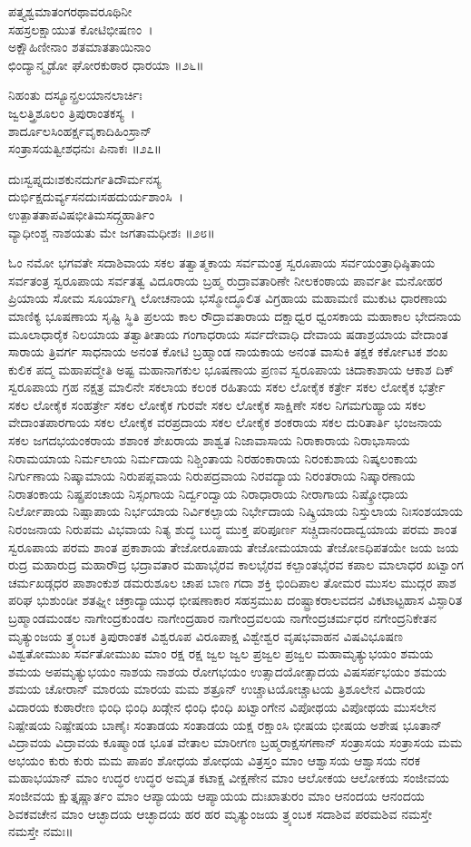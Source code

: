 ಪತ್ತ್ಯಶ್ವಮಾತಂಗರಥಾವರೂಥಿನೀ\\ಸಹಸ್ರಲಕ್ಷಾಯುತ ಕೋಟಿಭೀಷಣಂ~।\\
ಅಕ್ಷೌಹಿಣೀನಾಂ ಶತಮಾತತಾಯಿನಾಂ\\ಛಿಂದ್ಯಾನ್ಮೃಡೋ ಘೋರಕುಠಾರ ಧಾರಯಾ ॥೨೬॥

ನಿಹಂತು ದಸ್ಯೂನ್ಪ್ರಲಯಾನಲಾರ್ಚಿಃ\\ಜ್ವಲತ್ತ್ರಿಶೂಲಂ ತ್ರಿಪುರಾಂತಕಸ್ಯ~।\\
ಶಾರ್ದೂಲಸಿಂಹರ್ಕ್ಷವೃಕಾದಿಹಿಂಸ್ರಾನ್\\ಸಂತ್ರಾಸಯತ್ವೀಶಧನುಃ ಪಿನಾಕಃ ॥೨೭॥

ದುಃಸ್ವಪ್ನದುಃಶಕುನದುರ್ಗತಿದೌರ್ಮನಸ್ಯ\\ದುರ್ಭಿಕ್ಷದುರ್ವ್ಯಸನದುಃಸಹದುರ್ಯಶಾಂಸಿ~।\\
ಉತ್ಪಾತತಾಪವಿಷಭೀತಿಮಸದ್ಗ್ರಹಾರ್ತಿಂ\\ವ್ಯಾಧೀಂಶ್ಚ ನಾಶಯತು ಮೇ ಜಗತಾಮಧೀಶಃ ॥೨೮॥

ಓಂ ನಮೋ ಭಗವತೇ ಸದಾಶಿವಾಯ ಸಕಲ ತತ್ವಾತ್ಮಕಾಯ ಸರ್ವಮಂತ್ರ ಸ್ವರೂಪಾಯ ಸರ್ವಯಂತ್ರಾಧಿಷ್ಠಿತಾಯ ಸರ್ವತಂತ್ರ ಸ್ವರೂಪಾಯ ಸರ್ವತತ್ವ ವಿದೂರಾಯ ಬ್ರಹ್ಮ ರುದ್ರಾವತಾರಿಣೇ ನೀಲಕಂಠಾಯ ಪಾರ್ವತೀ ಮನೋಹರ ಪ್ರಿಯಾಯ ಸೋಮ ಸೂರ್ಯಾಗ್ನಿ ಲೋಚನಾಯ ಭಸ್ಮೋದ್ಧೂಲಿತ ವಿಗ್ರಹಾಯ ಮಹಾಮಣಿ ಮುಕುಟ ಧಾರಣಾಯ ಮಾಣಿಕ್ಯ ಭೂಷಣಾಯ ಸೃಷ್ಟಿ ಸ್ಥಿತಿ ಪ್ರಲಯ ಕಾಲ ರೌದ್ರಾವತಾರಾಯ ದಕ್ಷಾಧ್ವರ ಧ್ವಂಸಕಾಯ ಮಹಾಕಾಲ ಭೇದನಾಯ ಮೂಲಾಧಾರೈಕ ನಿಲಯಾಯ ತತ್ವಾತೀತಾಯ ಗಂಗಾಧರಾಯ ಸರ್ವದೇವಾಧಿ ದೇವಾಯ ಷಡಾಶ್ರಯಾಯ ವೇದಾಂತ ಸಾರಾಯ ತ್ರಿವರ್ಗ ಸಾಧನಾಯ ಅನಂತ ಕೋಟಿ ಬ್ರಹ್ಮಾಂಡ ನಾಯಕಾಯ ಅನಂತ ವಾಸುಕಿ ತಕ್ಷಕ ಕರ್ಕೋಟಕ ಶಂಖ ಕುಲಿಕ ಪದ್ಮ ಮಹಾಪದ್ಮೇತಿ ಅಷ್ಟ ಮಹಾನಾಗಕುಲ ಭೂಷಣಾಯ ಪ್ರಣವ ಸ್ವರೂಪಾಯ ಚಿದಾಕಾಶಾಯ ಆಕಾಶ ದಿಕ್ ಸ್ವರೂಪಾಯ ಗ್ರಹ ನಕ್ಷತ್ರ ಮಾಲಿನೇ ಸಕಲಾಯ ಕಲಂಕ ರಹಿತಾಯ ಸಕಲ ಲೋಕೈಕ ಕರ್ತ್ರೇ ಸಕಲ ಲೋಕೈಕ ಭರ್ತ್ರೇ ಸಕಲ ಲೋಕೈಕ ಸಂಹರ್ತ್ರೇ ಸಕಲ ಲೋಕೈಕ ಗುರವೇ ಸಕಲ ಲೋಕೈಕ ಸಾಕ್ಷಿಣೇ ಸಕಲ ನಿಗಮಗುಹ್ಯಾಯ ಸಕಲ ವೇದಾಂತಪಾರಗಾಯ ಸಕಲ ಲೋಕೈಕ ವರಪ್ರದಾಯ ಸಕಲ ಲೋಕೈಕ ಶಂಕರಾಯ ಸಕಲ ದುರಿತಾರ್ತಿ ಭಂಜನಾಯ ಸಕಲ ಜಗದಭಯಂಕರಾಯ ಶಶಾಂಕ ಶೇಖರಾಯ ಶಾಶ್ವತ ನಿಜಾವಾಸಾಯ ನಿರಾಕಾರಾಯ ನಿರಾಭಾಸಾಯ ನಿರಾಮಯಾಯ ನಿರ್ಮಲಾಯ ನಿರ್ಮದಾಯ ನಿಶ್ಚಿಂತಾಯ ನಿರಹಂಕಾರಾಯ ನಿರಂಕುಶಾಯ ನಿಷ್ಕಲಂಕಾಯ ನಿರ್ಗುಣಾಯ ನಿಷ್ಕಾಮಾಯ ನಿರುಪಪ್ಲವಾಯ ನಿರುಪದ್ರವಾಯ ನಿರವದ್ಯಾಯ ನಿರಂತರಾಯ ನಿಷ್ಕಾರಣಾಯ ನಿರಾತಂಕಾಯ ನಿಷ್ಪ್ರಪಂಚಾಯ ನಿಸ್ಸಂಗಾಯ ನಿರ್ದ್ವಂದ್ವಾಯ ನಿರಾಧಾರಾಯ ನೀರಾಗಾಯ ನಿಷ್ಕ್ರೋಧಾಯ ನಿರ್ಲೋಪಾಯ ನಿಷ್ಪಾಪಾಯ ನಿರ್ಭಯಾಯ ನಿರ್ವಿಕಲ್ಪಾಯ ನಿರ್ಭೇದಾಯ ನಿಷ್ಕ್ರಿಯಾಯ ನಿಸ್ತುಲಾಯ ನಿಃಸಂಶಯಾಯ ನಿರಂಜನಾಯ ನಿರುಪಮ ವಿಭವಾಯ ನಿತ್ಯ ಶುದ್ಧ ಬುದ್ಧ ಮುಕ್ತ ಪರಿಪೂರ್ಣ ಸಚ್ಚಿದಾನಂದಾದ್ವಯಾಯ ಪರಮ ಶಾಂತ ಸ್ವರೂಪಾಯ ಪರಮ ಶಾಂತ ಪ್ರಕಾಶಾಯ ತೇಜೋರೂಪಾಯ ತೇಜೋಮಯಾಯ ತೇಜೋಽಧಿಪತಯೇ ಜಯ ಜಯ ರುದ್ರ ಮಹಾರುದ್ರ ಮಹಾರೌದ್ರ ಭದ್ರಾವತಾರ ಮಹಾಭೈರವ ಕಾಲಭೈರವ ಕಲ್ಪಾಂತಭೈರವ ಕಪಾಲ ಮಾಲಾಧರ ಖಟ್ವಾಂಗ ಚರ್ಮಖಡ್ಗಧರ ಪಾಶಾಂಕುಶ ಡಮರುಶೂಲ ಚಾಪ ಬಾಣ ಗದಾ ಶಕ್ತಿ ಭಿಂದಿಪಾಲ ತೋಮರ ಮುಸಲ ಮುದ್ಗರ ಪಾಶ ಪರಿಘ ಭುಶುಂಡೀ ಶತಘ್ನೀ ಚಕ್ರಾದ್ಯಾಯುಧ ಭೀಷಣಾಕಾರ ಸಹಸ್ರಮುಖ ದಂಷ್ಟ್ರಾಕರಾಲವದನ ವಿಕಟಾಟ್ಟಹಾಸ ವಿಸ್ಫಾರಿತ ಬ್ರಹ್ಮಾಂಡಮಂಡಲ ನಾಗೇಂದ್ರಕುಂಡಲ ನಾಗೇಂದ್ರಹಾರ ನಾಗೇಂದ್ರವಲಯ ನಾಗೇಂದ್ರಚರ್ಮಧರ ನಗೇಂದ್ರನಿಕೇತನ ಮೃತ್ಯುಂಜಯ ತ್ರ್ಯಂಬಕ ತ್ರಿಪುರಾಂತಕ ವಿಶ್ವರೂಪ ವಿರೂಪಾಕ್ಷ ವಿಶ್ವೇಶ್ವರ ವೃಷಭವಾಹನ ವಿಷವಿಭೂಷಣ ವಿಶ್ವತೋಮುಖ ಸರ್ವತೋಮುಖ ಮಾಂ ರಕ್ಷ ರಕ್ಷ ಜ್ವಲ ಜ್ವಲ ಪ್ರಜ್ವಲ ಪ್ರಜ್ವಲ ಮಹಾಮೃತ್ಯುಭಯಂ ಶಮಯ ಶಮಯ ಅಪಮೃತ್ಯುಭಯಂ ನಾಶಯ ನಾಶಯ ರೋಗಭಯಂ ಉತ್ಸಾದಯೋತ್ಸಾದಯ ವಿಷಸರ್ಪಭಯಂ ಶಮಯ ಶಮಯ ಚೋರಾನ್ ಮಾರಯ ಮಾರಯ ಮಮ ಶತ್ರೂನ್ ಉಚ್ಚಾಟಯೋಚ್ಚಾಟಯ ತ್ರಿಶೂಲೇನ ವಿದಾರಯ ವಿದಾರಯ ಕುಠಾರೇಣ ಭಿಂಧಿ ಭಿಂಧಿ ಖಡ್ಗೇನ ಛಿಂಧಿ ಛಿಂಧಿ ಖಟ್ವಾಂಗೇನ ವಿಪೋಥಯ ವಿಪೋಥಯ ಮುಸಲೇನ ನಿಷ್ಪೇಷಯ ನಿಷ್ಪೇಷಯ ಬಾಣೈಃ ಸಂತಾಡಯ ಸಂತಾಡಯ ಯಕ್ಷ ರಕ್ಷಾಂಸಿ ಭೀಷಯ ಭೀಷಯ ಅಶೇಷ ಭೂತಾನ್ ವಿದ್ರಾವಯ ವಿದ್ರಾವಯ ಕೂಷ್ಮಾಂಡ ಭೂತ ವೇತಾಲ ಮಾರೀಗಣ ಬ್ರಹ್ಮರಾಕ್ಷಸಗಣಾನ್ ಸಂತ್ರಾಸಯ ಸಂತ್ರಾಸಯ ಮಮ ಅಭಯಂ ಕುರು ಕುರು ಮಮ ಪಾಪಂ ಶೋಧಯ ಶೋಧಯ ವಿತ್ರಸ್ತಂ ಮಾಂ ಆಶ್ವಾಸಯ ಆಶ್ವಾಸಯ ನರಕ ಮಹಾಭಯಾನ್ ಮಾಂ ಉದ್ಧರ ಉದ್ಧರ ಅಮೃತ ಕಟಾಕ್ಷ ವೀಕ್ಷಣೇನ ಮಾಂ ಆಲೋಕಯ ಆಲೋಕಯ ಸಂಜೀವಯ ಸಂಜೀವಯ ಕ್ಷುತ್ತೃಷ್ಣಾರ್ತಂ ಮಾಂ ಆಪ್ಯಾಯಯ ಆಪ್ಯಾಯಯ ದುಃಖಾತುರಂ ಮಾಂ ಆನಂದಯ ಆನಂದಯ ಶಿವಕವಚೇನ ಮಾಂ ಆಚ್ಛಾದಯ ಆಚ್ಛಾದಯ ಹರ ಹರ ಮೃತ್ಯುಂಜಯ ತ್ರ್ಯಂಬಕ ಸದಾಶಿವ ಪರಮಶಿವ ನಮಸ್ತೇ ನಮಸ್ತೇ ನಮಃ॥
